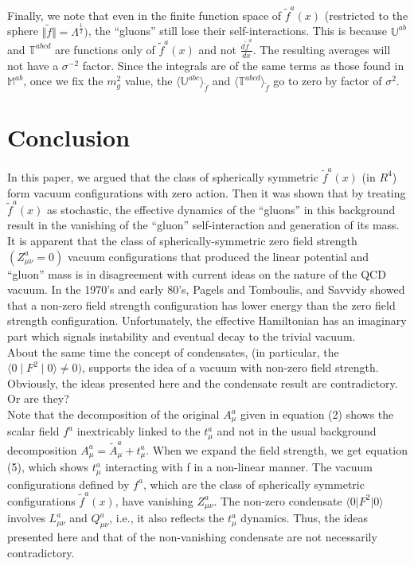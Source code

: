 \documentclass[a4paper,12pt]{article}
\begin{document}
Finally, we note that even in the finite function space of $\tilde{f}^{a}(x)$ (restricted to the sphere $\Vert\tilde{f}\Vert = \Lambda^{\frac{1}{2}})$, the ``gluons'' still lose their self-interactions.  This is because $\mathbb{U}^{ab}$ and $\mathbb{T}^{abcd}$ are functions only of $\tilde{f}^{a}(x)$ and not $\frac{d\tilde{f}^{a}}{dx}$.  The resulting averages will not have a $\sigma^{-2}$ factor.  Since the integrals are of the same terms as those found in $\mathbb{M}^{ab}$, once we fix the $m^{2}_{g}$ value, the $\langle\mathbb{U}^{abc}\rangle_{\tilde{f}}$ and $\langle\mathbb{T}^{abcd}\rangle_{\tilde{f}}$ go to zero by factor of $\sigma^{2}$.

\section{Conclusion}

In this paper, we argued that the class of spherically symmetric $\tilde{f}^{a}(x)$ (in $R^{4}$) form vacuum configurations with zero action.  Then it was shown that by treating $\tilde {f}^{a}(x)$ as stochastic, the effective dynamics of the ``gluons'' in this background result in the vanishing of the ``gluon'' self-interaction and generation of its mass.\\

It is apparent that the class of spherically-symmetric zero field strength $(Z^{a}_{\mu\nu}=0)$ vacuum configurations that produced the linear potential and ``gluon'' mass is in disagreement with current ideas on the nature of the QCD vacuum.  In the 1970's and early 80's, Pagels and Tomboulis\cite{Pagels}, and Savvidy\cite{Sav} showed that a non-zero field strength configuration has lower energy than the zero field strength configuration.  Unfortunately, the effective Hamiltonian has an imaginary part which signals instability and eventual decay to the trivial vacuum.\\

About the same time the concept of condensates\cite{Shifman}, (in particular, the $\langle 0\mid F^{2}\mid 0\rangle\neq 0)$, supports the idea of a vacuum with non-zero field strength.  Obviously, the ideas presented here and the condensate result are contradictory.  Or are they?\\

Note that the decomposition of the original $A^{a}_{\mu}$ given in equation (2) shows the scalar field $f^{a}$ inextricably linked to the $t^{a}_{\mu}$ and not in the usual background decomposition $A^{a}_{\mu} = \tilde {A}^{a}_{\mu} + t^{a}_{\mu}$.  When we expand the field strength, we get equation (5), which shows $t^{a}_{\mu}$ interacting with f in a non-linear manner.  The vacuum configurations defined by $f^{a}$, which are the class of spherically symmetric configurations $\tilde{f}^{a}(x)$, have vanishing $Z^{a}_{\mu\nu}$.  The non-zero condensate $\langle 0\vert F^{2}\vert 0\rangle$ involves $L^{a}_{\mu\nu}$ and $Q^{a}_{\mu\nu}$, i.e., it also reflects the $t^{a}_{\mu}$ dynamics.  Thus, the ideas presented here and that of the non-vanishing condensate are not necessarily contradictory.\\
\end{document}
